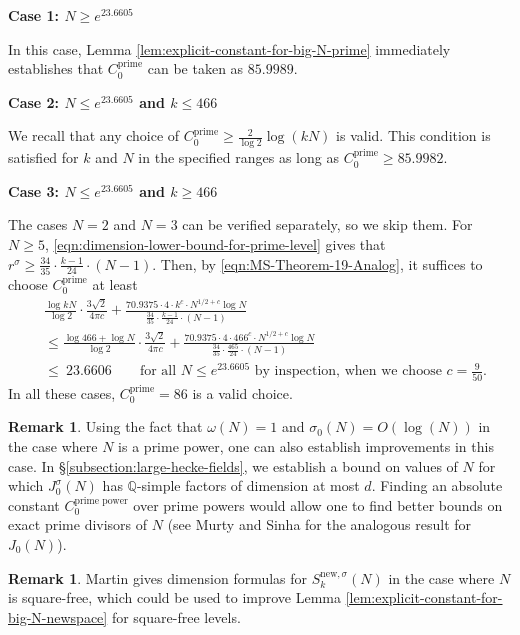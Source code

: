\documentclass[11pt,letterpaper,reqno]{amsart}
\theoremstyle{definition}
\newtheorem{remark}[theorem]{Remark}
\numberwithin{equation}{section}
\numberwithin{figure}{section}
\numberwithin{table}{section}
\newcommand{\nw}{\mathrm{new}}
\begin{document}
\textbf{Case 1: $N \geq e^{23.6605}$}

In this case, Lemma \ref{lem:explicit-constant-for-big-N-prime} immediately establishes that $C_0^{\text{prime}}$ can be taken as $85.9989.$

\textbf{Case 2: $N \leq e^{23.6605}$ and $k \leq 466$}

We recall that any choice of $C_0^{\text{prime}} \geq \frac{2}{\log 2} \log(kN)$ is valid. This condition is satisfied for $k$ and $N$ in the specified ranges as long as $C_0^{\text{prime}} \geq 85.9982.$

\textbf{Case 3: $N \leq e^{23.6605}$ and $k \geq 466$}

The cases $N = 2$ and $N = 3$ can be verified separately, so we skip them. For $N \geq 5$, \eqref{eqn:dimension-lower-bound-for-prime-level} gives that $r^\sigma \geq \frac{34}{35} \cdot \frac{k - 1}{24} \cdot (N - 1).$ Then, by \eqref{eqn:MS-Theorem-19-Analog}, it suffices to choose $C_0^{\text{prime}}$ at least
\begin{align}
    &\frac{\log kN}{\log 2} \cdot \frac{3\sqrt{2}}{4\pi c} + \frac{70.9375 \cdot 4 \cdot k^c \cdot N^{1/2 + c} \log N}{\frac{34}{35} \cdot \frac{k - 1}{24} \cdot (N - 1)}\\
    &\leq \frac{\log 466 + \log N}{\log 2} \cdot \frac{3\sqrt{2}}{4\pi c} + \frac{70.9375 \cdot 4 \cdot 466^c \cdot N^{1/2 + c} \log N}{\frac{34}{35} \cdot \frac{465}{24} \cdot (N - 1)}\\
    &\leq \ 23.6606 \qquad  \text{for all $N \leq e^{23.6605}$ by inspection, when we choose $c = \frac{9}{50}$.}
\end{align}
In all these cases, $C_0^{\text{prime}} = 86$ is a valid choice.

\begin{remark}
    Using the fact that $\omega(N) = 1$ and $\sigma_0(N) = O(\log(N))$ in the case where $N$ is a prime power, one can also establish improvements in this case. In \S \ref{subsection:large-hecke-fields}, we establish a bound on values of $N$ for which $J_0^\sigma(N)$ has $\mathbb{Q}$-simple factors of dimension at most $d.$ Finding an absolute constant $C_0^{\text{prime power}}$ over prime powers would allow one to find better bounds on exact prime divisors of $N$ (see Murty and Sinha \cite[Theorem 32]{MS07} for the analogous result for $J_0(N)$). 
\end{remark}

\begin{remark}
    Martin \cite{martin2005dimensions} gives dimension formulas for $S_k^{\nw, \sigma}(N)$ in the case where $N$ is square-free, which could be used to improve Lemma \ref{lem:explicit-constant-for-big-N-newspace} for square-free levels.
\end{remark}
\end{document}
